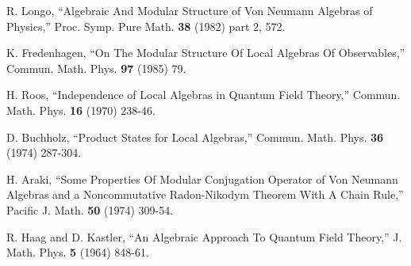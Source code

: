 \documentclass[12pt]{article}
\numberwithin{equation}{section}
\begin{document}
\begin{thebibliography}{99}
R. Longo, ``Algebraic And Modular Structure of Von Neumann Algebras of Physics,'' Proc. Symp. Pure Math. {\bf 38} (1982) part 2, 572.

K. Fredenhagen, ``On The Modular Structure Of Local Algebras Of Observables,'' Commun. Math. Phys. {\bf 97} (1985) 79.

H. Roos, ``Independence of Local Algebras in Quantum Field Theory,'' Commun. Math. Phys. {\bf 16} (1970) 238-46.

D. Buchholz, ``Product States for Local Algebras,''  Commun. Math. Phys. {\bf 36} (1974) 287-304.


H. Araki, ``Some Properties Of Modular Conjugation Operator of Von Neumann Algebras and a Noncommutative Radon-Nikodym
Theorem With A Chain Rule,'' Pacific J. Math. {\bf 50} (1974) 309-54.

R. Haag and D. Kastler, ``An Algebraic Approach To Quantum Field Theory,''
J. Math. Phys. {\bf 5} (1964) 848-61.


\end{thebibliography}
\end{document}
